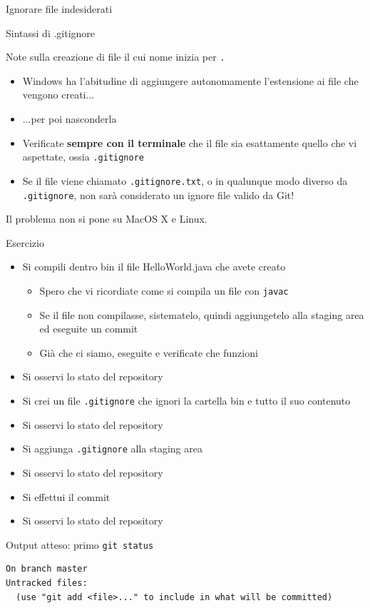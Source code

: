 \documentclass[presentation]{beamer}
\begin{document}
\begin{frame}{Ignorare file indesiderati}
\begin{block}{Sintassi di .gitignore}
\begin{itemize}
\begin{itemize}
			\end{itemize}
		\end{itemize}
	\end{block}
	\begin{block}{Note sulla creazione di file il cui nome inizia per \texttt{.}}
		\begin{itemize}
			\item Windows ha l'abitudine di aggiungere autonomamente l'estensione ai file che vengono creati...
			\item ...per poi nasconderla
			\item Verificate \textbf{sempre con il terminale} che il file sia esattamente quello che vi aspettate, ossia \texttt{.gitignore}
			\item Se il file viene chiamato \texttt{.gitignore.txt}, o in qualunque modo diverso da \texttt{.gitignore}, non sarà considerato un ignore file valido da Git!
		\end{itemize}
		Il problema non si pone su MacOS X e Linux.
	\end{block}
	\begin{block}{Esercizio}	
		\begin{itemize}
			\item Si compili dentro bin il file HelloWorld.java che avete creato
			\begin{itemize}
				\item Spero che vi ricordiate come si compila un file con \texttt{javac}
				\item Se il file non compilasse, sistematelo, quindi aggiungetelo alla staging area ed eseguite un commit
				\item Già che ci siamo, eseguite e verificate che funzioni
			\end{itemize}
			\item Si osservi lo stato del repository
			\item Si crei un file \texttt{.gitignore} che ignori la cartella bin e tutto il suo contenuto
			\item Si osservi lo stato del repository
			\item Si aggiunga \texttt{.gitignore} alla staging area
			\item Si osservi lo stato del repository
			\item Si effettui il commit
			\item Si osservi lo stato del repository
		\end{itemize}
	\end{block}
	\begin{block}{Output atteso: primo \texttt{git status}}
		\begin{Verbatim}[fontsize=\scriptsize]
On branch master
Untracked files:
  (use "git add <file>..." to include in what will be committed)


\end{Verbatim}
\end{block}
\end{frame}
\end{document}
